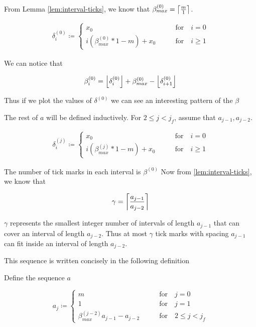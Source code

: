 From Lemma \ref{lem:interval-ticks}, we know that $\beta^{(0)}_{max} = \ceil{\frac{m}{1}}$. 

\begin{align}\label{delta_beta}
	\delta^{(0)}_i \coloneqq \begin{cases}
		x_0 \qquad &\text{for} \quad i = 0\\
		i (\beta^{(0)}_{max} * 1 - m) + x_0 \qquad &\text{for} \quad i \ge 1
	\end{cases}
\end{align}

We can notice that

\begin{align}\label{eq:beta_i}
	\beta^{(0)}_i = \floor{\delta^{(0)}_i} + \beta^{(0)}_{max} - \floor{\delta^{(0)}_{i+1}}
\end{align}

Thus if we plot the values of $\delta^{(0)}$ we can see an interesting pattern of the $\beta$

The rest of $a$ will be defined inductively. For $2 \le j < j_f$, assume that $a_{j-1}, a_{j-2}$.

\begin{align}\label{delta_beta}
	\delta^{(j)}_i \coloneqq \begin{cases}
		x_0 \qquad &\text{for} \quad i = 0\\
		i (\beta^{(j)}_{max} * 1 - m) + x_0 \qquad &\text{for} \quad i \ge 1
	\end{cases}
\end{align}

The number of tick marks in each interval is $\beta^{(0)}$
Now from \ref{lem:interval-ticks}, we know that 

\begin{align}
	\gamma = \ceil{\frac{a_{j-1}}{a_{j-2}}}
\end{align}

$\gamma$ represents the smallest integer number of intervals of length $a_{j-1}$ that can cover an interval of length $a_{j-2}$. Thus at most $\gamma$ tick marks with spacing $a_{j-1}$ can fit inside an interval of length $a_{j-2}$. 

This sequence is written concisely in the following definition

\begin{definition}
	Define the sequence $a$

	\begin{equation}
		a_j \coloneqq \begin{cases}
			m \qquad &\text{for} \quad j = 0\\
			1 \qquad &\text{for} \quad j = 1\\
			\beta^{(j-2)}_{max} a_{j-1} - a_{j-2} \qquad &\text{for} \quad 2 \le j < j_f
		\end{cases}
	\end{equation}

\end{definition}

